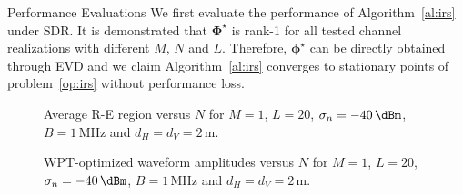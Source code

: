 \documentclass[journal]{IEEEtran}
\begin{document}
\begin{section}{Performance Evaluations}
		We first evaluate the performance of Algorithm~\ref{al:irs} under SDR. It is demonstrated that $\boldsymbol{\Phi}^{\star}$ is rank-\num{1} for all tested channel realizations with different $M$, $N$ and $L$. Therefore, $\boldsymbol{\phi}^{\star}$ can be directly obtained through EVD and we claim Algorithm~\ref{al:irs} converges to stationary points of problem~\ref{op:irs} without performance loss.

		\begin{figure}[!t]
			\centering
			\begin{adjustbox}{width=\linewidth}
				
			\end{adjustbox}
			\caption{Average R-E region versus $N$ for $M=1$, $L=20$, $\sigma_n=-40\,\si{\dBm}$, $B=1\,\si{\MHz}$ and $d_H=d_V=2\,\si{\meter}$.}
			\label{fi:re_subband}
		\end{figure}

		\begin{figure}[!t]
			\centering
			\begin{adjustbox}{width=\linewidth}
				
			\end{adjustbox}
			\caption{WPT-optimized waveform amplitudes versus $N$ for $M=1$, $L=20$, $\sigma_n=-40\,\si{\dBm}$, $B=1\,\si{\MHz}$ and $d_H=d_V=2\,\si{\meter}$.}
			\label{fi:waveform_subband}
		\end{figure}


\end{section}
\end{document}
